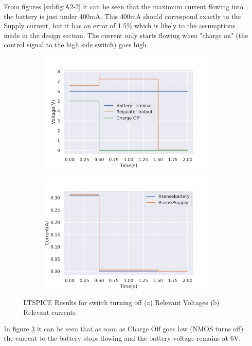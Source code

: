  From figures \ref{subfig:A2-2} it can be seen that the maximum current flowing into the battery is just under 400mA. This 400mA should correspond exactly to the Supply current, but it has an error of 1.5\% which is likely to the assumptions made in the design section. The current only starts flowing when "charge on" (the control signal to the high side switch) goes high.
 
 \begin{figure}[!htb]
 \footnotesize
 \centering
    \begin{subfigure}[]{0.42\textwidth}
              \centering
  		\includegraphics[width=1\linewidth]{./Figures/A2-3.png}
		    \caption{} \label{subfig:A2-3}
     \end{subfigure}
     \begin{subfigure}[]{0.42\textwidth}
             \centering
  		\includegraphics[width=1\linewidth]{./Figures/A2-4.png}
		   \caption{ } \label{subfig:A2-4}
     \end{subfigure}
   \caption[{LTSPICE switch turning off results}]{LTSPICE Results for switch turning off  (a)  Relevant Voltages (b)  Relevant currents  }
    \label{fig:two}
 \end{figure}
 \newpage
 In figure \ref{fig:two} it can be seen that as soon as Charge Off goes low (NMOS turns off) the current to the battery stops flowing and the battery voltage remains at 6V.



